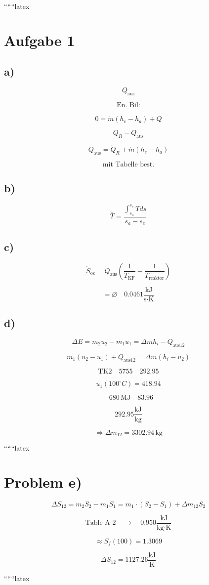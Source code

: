 
``````latex


\section*{Aufgabe 1}

\subsection*{a)}

\[
Q_{\text{aus}}
\]

\[
\text{En. Bil:}
\]

\[
0 = \dot{m} (h_e - h_a) + \dot{Q}
\]

\[
Q_R - Q_{\text{aus}}
\]

\[
Q_{\text{aus}} = \dot{Q}_R + \dot{m} (h_e - h_a)
\]

\[
\text{mit Tabelle best.}
\]

\subsection*{b)}

\[
\overline{T} = \frac{\int_{s_a}^{s_e} T ds}{s_a - s_e}
\]

\subsection*{c)}

\[
\dot{S}_{\text{oz}} = \dot{Q}_{\text{aus}} \left( \frac{1}{T_{\text{KF}}} - \frac{1}{T_{\text{reaktor}}} \right)
\]

\[
= \varnothing \quad 0.0461 \frac{\text{kJ}}{\text{s} \cdot \text{K}}
\]

\subsection*{d)}

\[
\Delta E = m_2 u_2 - m_1 u_1 = \Delta m h_i - Q_{\text{aus12}}
\]

\[
m_1 (u_2 - u_1) + Q_{\text{aus12}} = \Delta m (h_i - u_2)
\]

\[
\text{TK2} \quad 5755 \quad 292.95
\]

\[
u_1 (100^\circ C) = 418.94
\]

\[
-680 \, \text{MJ} \quad 83.96
\]

\[
292.95 \frac{\text{kJ}}{\text{kg}}
\]

\[
\Rightarrow \Delta m_{12} = 3302.94 \, \text{kg}
\]

``````latex

\section*{Problem e)}

\[
\Delta S_{12} = m_2 S_2 - m_1 S_1 = m_1 \cdot (S_2 - S_1) + \Delta m_{12} S_2
\]

\[
\text{Table A-2} \quad \rightarrow \quad 0.950 \frac{\text{kJ}}{\text{kg} \cdot \text{K}}
\]

\[
\approx S_f(100) = 1.3069
\]

\[
\Delta S_{12} = 1127.26 \frac{\text{kJ}}{\text{K}}
\]

``````latex


